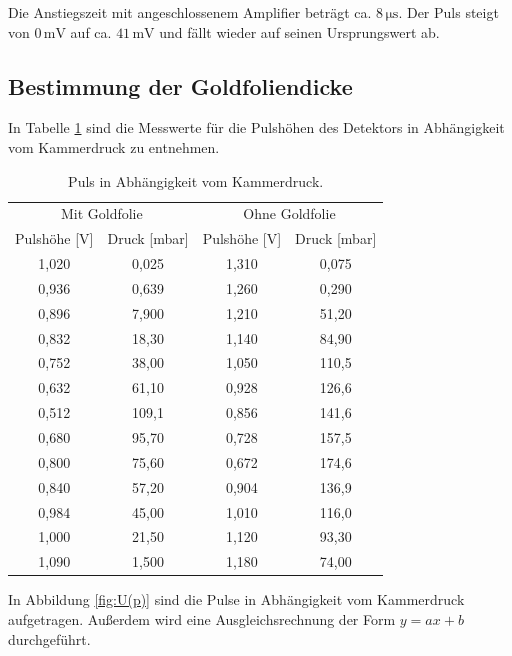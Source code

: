 Die Anstiegszeit mit angeschlossenem Amplifier beträgt ca. $8\,\si{\micro\second}$.
Der Puls steigt von $0\,\text{mV}$ auf ca. $41\,\text{mV}$ und fällt wieder auf seinen Ursprungswert ab.

\subsection{Bestimmung der Goldfoliendicke}
\label{gofodi}

In Tabelle \ref{tab:U(p)} sind die Messwerte für die Pulshöhen des Detektors in Abhängigkeit vom Kammerdruck zu entnehmen.

\begin{table}[H]
  \centering
  \begin{tabular}{cc|cc}
    \toprule
    \multicolumn{2}{c}{Mit Goldfolie} & \multicolumn{2}{c}{Ohne Goldfolie} \\
    Pulshöhe [V] & Druck [mbar] & Pulshöhe [V] & Druck [mbar] \\
    \midrule
    1,020 & 0,025 & 1,310 & 0,075 \\
    0,936 & 0,639 & 1,260 & 0,290 \\
    0,896 & 7,900 & 1,210 & 51,20 \\
    0,832 & 18,30 & 1,140 & 84,90 \\
    0,752 & 38,00 & 1,050 & 110,5 \\
    0,632 & 61,10 & 0,928 & 126,6 \\
    0,512 & 109,1 & 0,856 & 141,6 \\
    0,680 & 95,70 & 0,728 & 157,5 \\
    0,800 & 75,60 & 0,672 & 174,6 \\
    0,840 & 57,20 & 0,904 & 136,9 \\
    0,984 & 45,00 & 1,010 & 116,0 \\
    1,000 & 21,50 & 1,120 & 93,30 \\
    1,090 &  1,500 & 1,180 & 74,00 \\
    \bottomrule
  \end{tabular}
  \caption{Puls in Abhängigkeit vom Kammerdruck.}
  \label{tab:U(p)}
\end{table}

In Abbildung \ref{fig:U(p)} sind die Pulse in Abhängigkeit vom Kammerdruck aufgetragen.
Außerdem wird eine Ausgleichsrechnung der Form $y=ax+b$ durchgeführt.

